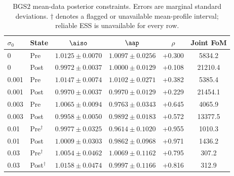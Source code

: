 \begin{table}[t]
\caption{\label{tab:baseline_BGS2}BGS2 mean-data posterior constraints. Errors are marginal standard deviations. $\dagger$ denotes a flagged or unavailable mean-profile interval; reliable ESS is unavailable for every row.}
\begin{ruledtabular}
\begin{tabular}{llcccc}
$\sigma_0$ & State & $\aiso$ & $\aap$ & $\rho$ & Joint FoM \\
\hline
0 & Pre & $1.0125\pm0.0070$ & $1.0097\pm0.0256$ & +0.300 & 5834.2 \\
0 & Post & $0.9972\pm0.0037$ & $1.0000\pm0.0129$ & +0.108 & 21210.4 \\
0.001 & Pre & $1.0147\pm0.0074$ & $1.0102\pm0.0271$ & +0.382 & 5385.4 \\
0.001 & Post & $0.9970\pm0.0037$ & $0.9970\pm0.0129$ & +0.229 & 21454.1 \\
0.003 & Pre & $1.0065\pm0.0094$ & $0.9763\pm0.0343$ & +0.645 & 4065.9 \\
0.003 & Post & $0.9958\pm0.0050$ & $0.9892\pm0.0183$ & +0.572 & 13377.5 \\
0.01 & Pre$^{\dagger}$ & $0.9977\pm0.0325$ & $0.9614\pm0.1020$ & +0.955 & 1010.3 \\
0.01 & Post & $1.0009\pm0.0303$ & $0.9862\pm0.0968$ & +0.971 & 1436.2 \\
0.03 & Pre$^{\dagger}$ & $1.0054\pm0.0462$ & $1.0069\pm0.1162$ & +0.795 & 307.2 \\
0.03 & Post$^{\dagger}$ & $1.0158\pm0.0474$ & $0.9997\pm0.1166$ & +0.816 & 312.9 \\
\end{tabular}
\end{ruledtabular}
\end{table}
